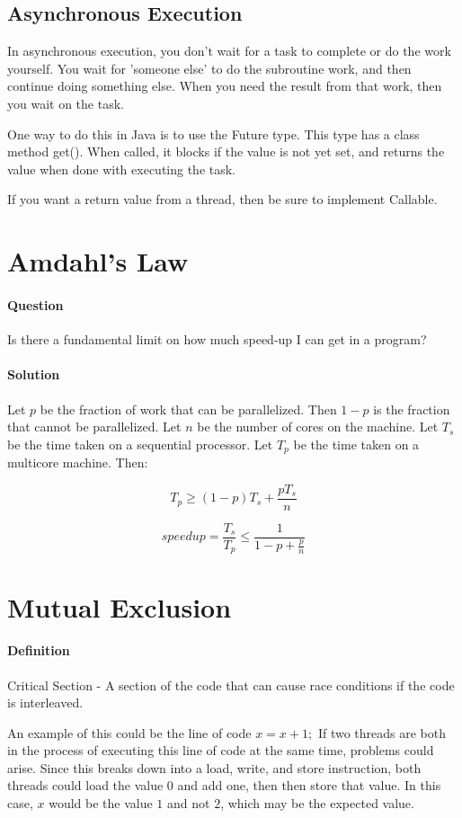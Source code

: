 \documentclass[twoside]{article}
\begin{document}
\subsection{Asynchronous Execution}
In asynchronous execution, you don't wait for a task to complete or do the work yourself. You wait for 'someone else' to do the subroutine work, and then continue doing something else. When you need the result from that work, then you wait on the task.

One way to do this in Java is to use the Future type. This type has a class method get(). When called, it blocks if the value is not yet set, and returns the value when done with executing the task.

If you want a return value from a thread, then be sure to implement Callable.
\section{Amdahl's Law}
\paragraph{Question}
Is there a fundamental limit on how much speed-up I can get in a program?
\paragraph{Solution}
Let $p$ be the fraction of work that can be parallelized.
Then $1-p$ is the fraction that cannot be parallelized.
Let $n$ be the number of cores on the machine.
Let $T_s$ be the time taken on a sequential processor.
Let $T_p$ be the time taken on a multicore machine.
Then:

$$T_p \geq (1-p)T_s + \frac{pT_s}{n}$$

$$speedup = \frac{T_s}{T_p} \leq \frac{1}{1-p+\frac{p}{n}}$$

\section{Mutual Exclusion}
\paragraph{Definition}
Critical Section - A section of the code that can cause race conditions if the code is interleaved.

An example of this could be the line of code $x = x + 1;$ If two threads are both in the process of executing this line of code at the same time, problems could arise. Since this breaks down into a load, write, and store instruction, both threads could load the value $0$ and add one, then then store that value. In this case, $x$ would be the value $1$ and not $2$, which may be the expected value.
\end{document}
